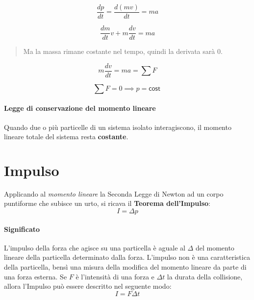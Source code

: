         \begin{equation*}
            \frac{dp}{dt} = \frac{d(mv)}{dt} = ma
        \end{equation*}

        \begin{equation*}
            \frac{dm}{dt} v + m \frac{dv}{dt} = ma
        \end{equation*}

        \begin{quote}
            Ma la massa rimane costante nel tempo, quindi la derivata sarà 0.
        \end{quote}

        \begin{equation*}
            m\frac{dv}{dt} = ma = \sum F
        \end{equation*}

        \begin{equation*}
            \sum F = 0 \implies p = \textsf{cost}\
        \end{equation*}

        \paragraph{Legge di conservazione del momento lineare} Quando due o più
        particelle di un sistema isolato interagiscono, il momento lineare 
        totale del sistema resta \textbf{costante}.


    \section{Impulso}
        Applicando al \textit{momento lineare} la Seconda Legge di Newton ad un
        corpo puntiforme che subisce un urto, si ricava il \textbf{Teorema
        dell'Impulso}:
        \begin{equation}
            I = \Delta p
        \end{equation}

        \paragraph{Significato} L'impulso della forza che agisce su una 
        particella è aguale al $\Delta$ del momento lineare della particella 
        determinato dalla forza. L'impulso non è una caratteristica della 
        particella, bensì una misura della modifica del momento lineare da 
        parte di una forza esterna.
        Se $F$ è l'intensità di una forza e $\Delta t$ la durata della 
        collisione, allora l'Impulso può essere descritto nel seguente modo:
        \begin{equation}
            I = F \Delta t
        \end{equation}

